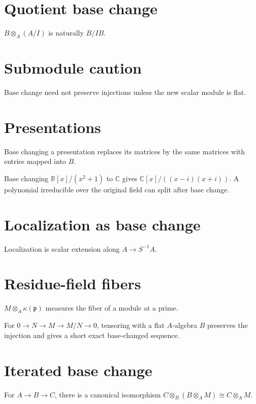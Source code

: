 \section{Quotient base change}
$B\otimes_A(A/I)$ is naturally $B/IB$.

\section{Submodule caution}
Base change need not preserve injections unless the new scalar module is flat.

\section{Presentations}
Base changing a presentation replaces its matrices by the same matrices with entries mapped into $B$.

\begin{example}\label{ex:v11-expand-02}
Base changing $\mathbb R[x]/(x^2+1)$ to $\mathbb C$ gives $\mathbb C[x]/((x-i)(x+i))$. A polynomial irreducible over the original field can split after base change.
\end{example}
\section{Localization as base change}
Localization is scalar extension along $A\to S^{-1}A$.

\section{Residue-field fibers}
$M\otimes_A\kappa(\mathfrak p)$ measures the fiber of a module at a prime.

\begin{example}\label{ex:v11-expand-03}
For $0\to N\to M\to M/N\to0$, tensoring with a flat $A$-algebra $B$ preserves the injection and gives a short exact base-changed sequence.
\end{example}
\section{Iterated base change}
For $A\to B\to C$, there is a canonical isomorphism $C\otimes_B(B\otimes_A M)\cong C\otimes_A M$.

